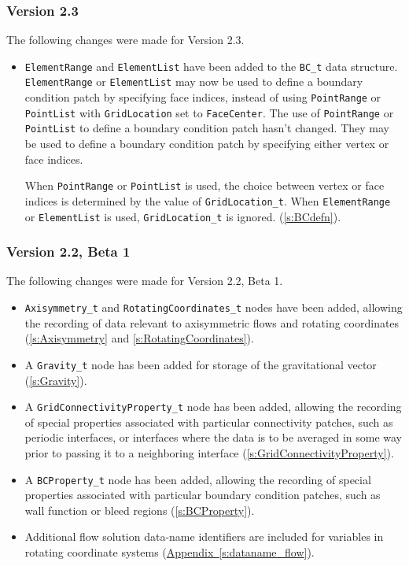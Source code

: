 \subsubsection{Version 2.3}
The following changes were made for Version 2.3.

\begin{itemize}
\item \texttt{ElementRange} and \texttt{ElementList} have been added to the
      \texttt{BC\_t} data structure.
      \texttt{ElementRange} or \texttt{ElementList} may now be used
      to define a boundary condition patch by specifying face indices,
      instead of using \texttt{PointRange} or \texttt{PointList} with
      \texttt{GridLocation} set to \texttt{FaceCenter}.
      The use of \texttt{PointRange} or \texttt{PointList} to define a
      boundary condition patch hasn't changed.
      They may be used to define a boundary condition patch by specifying
      either vertex or face indices.

      When \texttt{PointRange} or \texttt{PointList} is used, the choice
      between vertex or face indices is determined by the value of
      \texttt{GridLocation\_t}.
      When \texttt{ElementRange} or \texttt{ElementList} is used,
      \texttt{GridLocation\_t} is ignored.
      (\autoref{s:BCdefn}).
\end{itemize}

\subsubsection{Version 2.2, Beta 1}
The following changes were made for Version 2.2, Beta 1.

\begin{itemize}
\item \texttt{Axisymmetry\_t} and \texttt{RotatingCoordinates\_t}
      nodes have been added, allowing the recording of data relevant
      to axisymmetric flows and rotating coordinates
      (\autoref{s:Axisymmetry} and \autoref{s:RotatingCoordinates}).
\item A \texttt{Gravity\_t} node has been added for storage of the
      gravitational vector (\autoref{s:Gravity}).
\item A \texttt{GridConnectivityProperty\_t} node has been added, allowing
      the recording of special properties associated with particular
      connectivity patches, such as periodic interfaces, or interfaces
      where the data is to be averaged in some way prior to passing it
      to a neighboring interface (\autoref{s:GridConnectivityProperty}).
\item A \texttt{BCProperty\_t} node has been added, allowing the recording
      of special properties associated with particular boundary
      condition patches, such as wall function or bleed regions
      (\autoref{s:BCProperty}).
\item Additional flow solution data-name identifiers are included
      for variables in rotating coordinate systems
      (\hyperref[s:dataname_flow]{Appendix~\ref*{s:dataname_flow}}).
\end{itemize}


